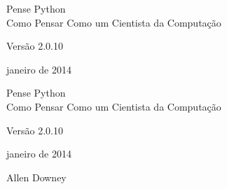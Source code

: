 \documentclass[10pt]{book}
\newcommand{\theversion}{2.0.10}
\newcommand{\thedate}{janeiro de 2014}
\begin{document}
\begin{latexonly}

\renewcommand{\blankpage}{\thispagestyle{empty} \quad \newpage}



\thispagestyle{empty}

\begin{flushright}
\vspace*{2.0in}

\begin{spacing}{3}
{\huge Pense Python}\\
{\Large Como Pensar Como um Cientista da Computação}
\end{spacing}

\vspace{0.25in}

Versão \theversion

\thedate

\vfill

\end{flushright}


\blankpage
\blankpage

\pagebreak
\thispagestyle{empty}

\begin{flushright}
\vspace*{2.0in}

\begin{spacing}{3}
{\huge Pense Python}\\
{\Large Como Pensar Como um Cientista da Computação}
\end{spacing}

\vspace{0.25in}

Versão \theversion

\thedate

\vspace{1in}


{\Large
Allen Downey\\
}


\vspace{0.5in}


\end{flushright}
\end{latexonly}
\end{document}
